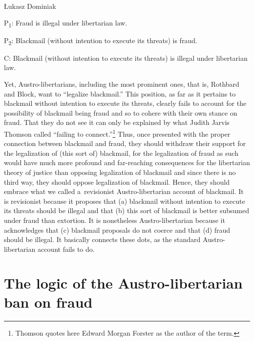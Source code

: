 \begin{artengenv}{Łukasz Dominiak}
\medskip

\noindent P\textsubscript{1}: Fraud is illegal under libertarian law.



\noindent P\textsubscript{2}: Blackmail (without intention to execute its threats) is fraud.



\noindent C: Blackmail (without intention to execute its threats) is illegal under libertarian law.

\medskip

Yet, Austro-libertarians, including the most prominent ones, that is, Rothbard and Block, want to ``legalize blackmail.'' 
\parencite[see][]{block_legalize_2013} %
 This position, as far as it pertains to blackmail without intention to execute its threats, clearly fails to account for the possibility of blackmail being fraud and so to cohere with their own stance on fraud. That they do not see it can only be explained by what Judith Jarvis Thomson 
\parencite*[][pp.25–33]{thomson_realm_1990} %
 called ``failing to connect.''\footnote{Thomson quotes here Edward Morgan Forster 
\parencite*[][]{forster_howards_1941} %
 as the author of the term.} Thus, once presented with the proper connection between blackmail and fraud, they should withdraw their support for the legalization of (this sort of) blackmail, for the legalization of fraud as such would have much more profound and far-reaching consequences for the libertarian theory of justice than opposing legalization of blackmail and since there is no third way, they should oppose legalization of blackmail. Hence, they should embrace what we called a~revisionist Austro-libertarian account of blackmail. It is revisionist because it proposes that (a) blackmail without intention to execute its threats should be illegal and that (b) this sort of blackmail is better subsumed under fraud than extortion. It is nonetheless Austro-libertarian because it acknowledges that (c) blackmail proposals do not coerce and that (d) fraud should be illegal. It basically connects these dots, as the standard Austro-libertarian account fails to do.



\section{The logic of the Austro-libertarian ban on fraud}


\end{artengenv}
